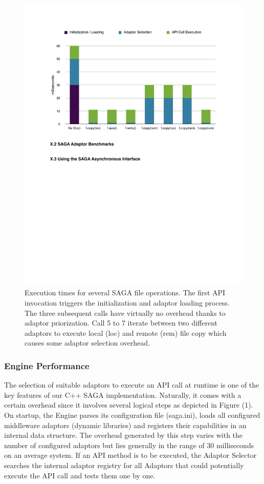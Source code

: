 \begin{figure}[!ht]
  \begin{center}
      \includegraphics[width=1\textwidth]{../figures/perf_overhead.pdf}
  \end{center}
 \up\up\up\up\up
  \caption{\small Execution times for several SAGA file operations. The first API invocation triggers the initialization and adaptor loading process. The three subsequent calls have virtually no overhead thanks to adaptor priorization. Call 5 to 7 iterate between two different adaptors to execute local (loc) and remote (rem) file copy which causes some adaptor selection overhead.}
 \label{fig_perf_overhead}
\end{figure}

\subsubsection{Engine Performance}\label{perf_engine}
The selection of suitable adaptors to execute an API call at runtime is one of the key features of our C++ SAGA implementation. Naturally, it comes with a certain overhead since it involves several logical steps as depicted in Figure (1). On startup, the Engine parses its configuration file (saga.ini), loads all configured middleware adaptors (dynamic libraries) and registers their capabilities in an internal data structure. The overhead generated by this step varies with the number of configured adaptors but lies generally in the range of 30 milliseconds on an average system. 
If an API method is to be executed, the Adaptor Selector searches the internal adaptor registry for all Adaptors that could potentially execute the API call and tests them one by one.

